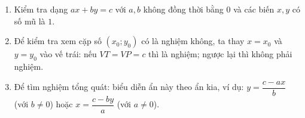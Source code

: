 \begin{enumerate}
\item Kiểm tra dạng $ax + by = c$ với $a, b$ không đồng thời bằng $0$ và các biến $x, y$ có số mũ là $1$.
\item Để kiểm tra xem cặp số $(x_0; y_0)$ có là nghiệm không, ta thay $x = x_0$ và $y = y_0$ vào vế trái: nếu $VT = VP = c$ thì là nghiệm; ngược lại thì không phải nghiệm.
\item Để tìm nghiệm tổng quát: biểu diễn ẩn này theo ẩn kia, ví dụ: $y = \dfrac{c - ax}{b}$ (với $b \ne 0$) hoặc $x = \dfrac{c - by}{a}$ (với $a \ne 0$).
\end{enumerate}
